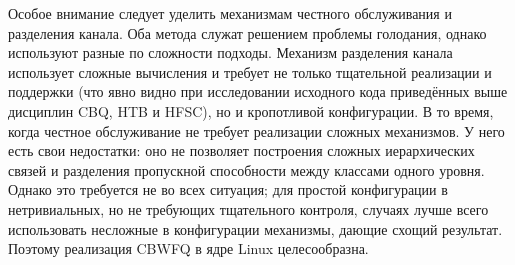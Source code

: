 	Особое внимание следует уделить механизмам честного обслуживания и
	разделения канала. Оба метода служат решением проблемы голодания,
	однако используют разные по сложности подходы. Механизм разделения канала
	использует сложные вычисления и требует не только тщательной реализации
	и поддержки (что явно видно при исследовании исходного кода
	приведённых выше дисциплин CBQ, HTB и HFSC), но и кропотливой конфигурации. 
	В то время, когда честное обслуживание не требует реализации сложных механизмов.
	У него есть свои недостатки: оно не позволяет построения сложных иерархических
	связей и разделения пропускной способности между классами одного уровня. 
	Однако это требуется не во всех ситуация; для простой конфигурации
	в нетривиальных, но не требующих тщательного контроля, случаях
	лучше всего использовать несложные в конфигурации механизмы, дающие
	схощий результат. Поэтому реализация CBWFQ в ядре Linux целесообразна.

